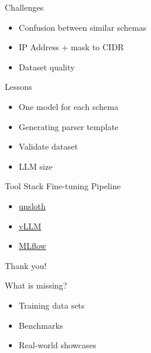 \documentclass[aspectratio=169]{beamer}
\begin{document}
\begin{frame}{Challenges}

  \begin{itemize}
    \setlength\itemsep{1em}
    \item Confusion between similar schemas
    \item IP Address + mask to CIDR
    \item Dataset quality
  \end{itemize}

\end{frame}

\begin{frame}{Lessons}

  \begin{itemize}
    \setlength\itemsep{1em}
    \item One model for each schema
    \item Generating parser template
    \item Validate dataset
    \item LLM size
  \end{itemize}

\end{frame}

\begin{frame}{Tool Stack Fine-tuning Pipeline}

  \begin{itemize}
    \setlength\itemsep{1em}
    \item \href{https://github.com/unslothai/unsloth}{unsloth}
    \item \href{https://github.com/vllm-project/vllm}{vLLM}
    \item \href{https://github.com/mlflow/mlflow}{MLflow}
  \end{itemize}

\end{frame}

{
  \begin{frame}[plain,c]
    \begin{center}
      \Huge \color[rgb]{1,1,1}Thank you!
    \end{center}
  \end{frame}
}

\begin{frame}{What is missing?}

  \begin{itemize}
    \setlength\itemsep{1em}
    \item Training data sets
    \item Benchmarks
    \item Real-world showcases
  \end{itemize}

\end{frame}
\end{document}

